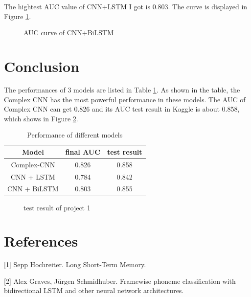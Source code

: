 \documentclass{article}
\begin{document}
The hightest AUC value of CNN+LSTM I got is 0.803. The curve is displayed in Figure \ref{CNN+BiLSTM}.
\begin{figure}[h]
	\centering
	\caption{AUC curve of CNN+BiLSTM}
	\label{CNN+BiLSTM}
\end{figure} 

\section{Conclusion}
The performances of 3 models are listed in Table \ref{table 1}. As shown in the table, the Complex CNN has the most powerful performance in these models. The AUC of Complex CNN can get 0.826 and its AUC test result in Kaggle is about 0.858, which shows in Figure \ref{final result}. 
\begin{table} [h]
  \caption{Performance of different models}
  \label{table 1}
  \centering
  \begin{tabular}{c|c|c}
    \toprule
   	Model   	& \quad final AUC \quad &\quad test result \quad \\
    \midrule 
	Complex-CNN & 0.826 & 0.858\\
	CNN + LSTM  & 0.784 & 0.842\\
	CNN + BiLSTM& 0.803 & 0.855\\
    \bottomrule
  \end{tabular}
\end{table}

\begin{figure}[h]
	\centering
	\caption{test result of project 1}
	\label{final result}
\end{figure} 




\section*{References}
[1] Sepp Hochreiter. Long Short-Term Memory. 

[2] Alex Graves, Jürgen Schmidhuber. Framewise phoneme classification with bidirectional LSTM and other neural network architectures. 
\end{document}
